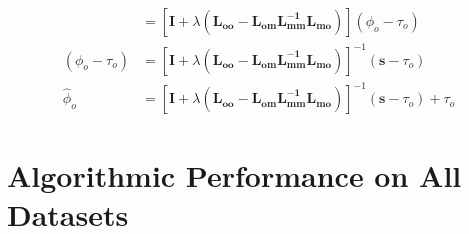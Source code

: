 \documentclass{article}
\begin{document}
\begin{align}
            &= \left[
                \mathbf{I} + \lambda\left(\mathbf{L_{oo}} -
                    \mathbf{L_{om}}\mathbf{L_{mm}^{-1}}\mathbf{L_{mo}}
                \right)
            \right](\phi_o - \tau_o) \nonumber\\
            (\phi_o - \tau_o) &= \left[
                \mathbf{I} + \lambda\left(\mathbf{L_{oo}} -
                    \mathbf{L_{om}}\mathbf{L_{mm}^{-1}}\mathbf{L_{mo}}
                \right)
            \right]^{-1}(\mathbf{s} - \tau_o) \nonumber\\
            {\hat \phi_o} &= \left[
                \mathbf{I} + \lambda\left(\mathbf{L_{oo}} -
                    \mathbf{L_{om}}\mathbf{L_{mm}^{-1}}\mathbf{L_{mo}}
                \right)
            \right]^{-1}(\mathbf{s} - \tau_o) + \tau_o
            \label{eqn:estimate_of_phi_o_complete}
        \end{align}

\section{Algorithmic Performance on All Datasets}\label{sec:algorithm_performance}



\end{document}
